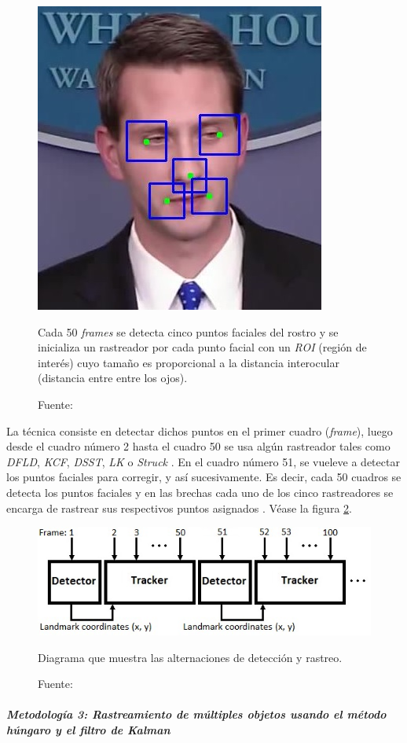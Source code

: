 \documentclass[a4paper,openright,12pt]{report}
\begin{document}
\begin{figure}[H]
  \centering
    \includegraphics[width=0.3\columnwidth]{../images/landmark-tracking-1.png}\par
  \caption{Cada 50 \textit{frames} se detecta cinco puntos faciales del rostro y
    se inicializa un rastreador por cada punto facial con un \textit{ROI}
    (región de interés) cuyo tamaño es proporcional a la distancia interocular
    (distancia entre entre los ojos).}
  \caption*{Fuente: \cite{wettum2017facial}}
  \label{fig:landmark-tracking-5-keypoints}
\end{figure}

La técnica consiste en detectar dichos puntos en el primer cuadro
(\textit{frame}), luego desde el cuadro número 2 hasta el cuadro 50 se usa algún
rastreador tales como \textit{DFLD}, \textit{KCF}, \textit{DSST}, \textit{LK} o
\textit{Struck} \cite{wettum2017facial}. En el cuadro número 51, se vueleve a
detectar los puntos faciales para corregir, y así sucesivamente. Es decir,
cada 50 cuadros se detecta los puntos faciales y en las brechas cada uno de los
cinco rastreadores se encarga de rastrear sus respectivos puntos asignados
\cite{wettum2017facial}. Véase la figura \ref{fig:landmark-tracking-diagram}.\\

\begin{figure}[H]
  \centering
    \includegraphics[width=0.5\columnwidth]{../images/landmark-tracking-2.png}\par
  \caption{Diagrama que muestra las alternaciones de detección y rastreo.}
  \caption*{Fuente: \cite{wettum2017facial}}
  \label{fig:landmark-tracking-diagram}
\end{figure}


\subparagraph{Metodología 3: Rastreamiento de múltiples objetos usando el
método húngaro y el filtro de Kalman}
\mbox{} \\
\end{document}
